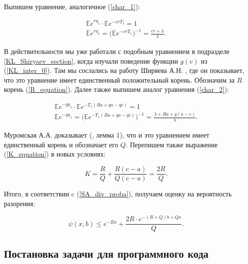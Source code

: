 \documentclass{article}
\theoremstyle{plain}
\theoremstyle{plain}
\theoremstyle{plain}
\theoremstyle{plain}
\theoremstyle{definition}
\theoremstyle{remark}
\begin{document}
Выпишем уравнение, аналогичное (\ref{char_1}):

\begin{equation}
\begin{aligned}
\label{R_equation}
    \mathbb{E} e^{r \eta_1} \cdot \mathbb{E} e^{- cr T_1} = 1 \\
    \mathbb{E} e^{r \eta_1} = \Big( \mathbb{E} e^{-crT_1} \Big)^{-1} = \frac{cr + \lambda}{\lambda}.
\end{aligned}
\end{equation}

В действительности мы уже работали с подобным уравнением в подразделе \ref{KL_Shiryaev_section}, когда изучали поведение функции $g(v)$ из (\ref{KL_inter_0}). Там мы сослались на работу Ширяева А.Н. \cite{Shiryaev_stochastic}, где он показывает, что это уравнение имеет единственный положительный корень. Обозначим за $R$ корень (\ref{R_equation}). Далее также выпишем аналог уравнения (\ref{char_2}):

\begin{equation}
\begin{aligned}
\label{Q_equation}
    \mathbb{E} e^{- q \eta_1} \cdot \mathbb{E} e^{- T_1 (Ra + qa - qc)} = 1 \\
    \mathbb{E} e^{- q \eta_1} = \Big( \mathbb{E} e^{- T_1 (Ra + qa - qc)} \Big)^{-1} = \frac{\lambda + Ra +q(a - c)}{\lambda}.
\end{aligned}
\end{equation}

Муромская А.А. доказывает (\cite{SA_dividends}, лемма 1), что и это уравнением имеет единственный корень и обозначает его $Q$. Перепишем также выражение (\ref{K_equation}) в новых условиях:

\begin{equation}
    K = \frac{R}{Q} + \frac{R(c - a)}{Q(c - a)} = \frac{2R}{Q}.
\end{equation}

Итого, в соответствии c (\ref{SA_div_proba}), получаем оценку на вероятность разорения:

\begin{equation}
\label{KLStockUpperEstimation}
    \psi(x, b) \leq e^{-Rx} + \frac{2R \cdot e^{-(R + Q) b + Qx}}{Q}.
\end{equation}

\subsection{Постановка задачи для программного кода}
\end{document}
